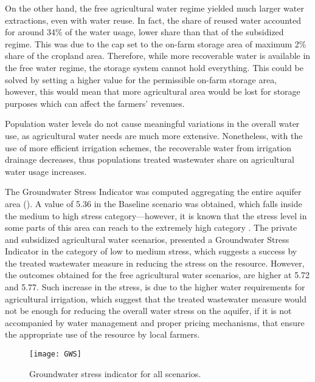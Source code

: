 On the other hand, the free agricultural water regime yielded much larger water extractions, even with water reuse. In fact, the share of reused water accounted for around 34\% of the water usage, lower share than that of the subsidized regime. This was due to the cap set to the on-farm storage area of maximum 2\% share of the cropland area. Therefore, while more recoverable water is available in the free water regime, the storage system cannot hold everything. This could be solved by setting a higher value for the permissible on-farm storage area, however, this would mean that more agricultural area would be lost for storage purposes which can affect the farmers' revenues.

Population water levels do not cause meaningful variations in the overall water use, as agricultural water needs are much more extensive. Nonetheless, with the use of more efficient irrigation schemes, the recoverable water from irrigation drainage decreases, thus populations treated wastewater share on agricultural water usage increases.

The Groundwater Stress Indicator was computed aggregating the entire aquifer area (). A value of 5.36 in the Baseline scenario was obtained, which falls inside the medium to high stress category---however, it is known that the stress level in some parts of this area can reach to the extremely high category \cite{herbertGlobalAssessmentCurrent2019}. The private and subsidized agricultural water scenarios, presented a Groundwater Stress Indicator in the category of low to medium stress, which suggests a success by the treated wastewater measure in reducing the stress on the resource. However, the outcomes obtained for the free agricultural water scenarios, are higher at 5.72 and 5.77. Such increase in the stress, is due to the higher water requirements for agricultural irrigation, which suggest that the treated wastewater measure would not be enough for reducing the overall water stress on the aquifer, if it is not accompanied by water management and proper pricing mechanisms, that ensure the appropriate use of the resource by local farmers.

\begin{figure}[!h]
	\centering
	\texttt{[image: GWS]}
	\caption{Groundwater stress indicator for all scenarios.}
	\label{fig:gws}
\end{figure}

